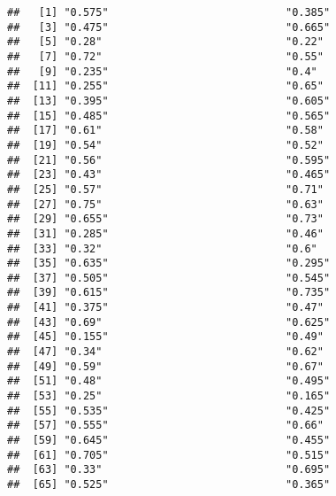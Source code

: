 \documentclass[
]{article}
\begin{document}
\begin{verbatim}
##   [1] "0.575"                            "0.385"                           
##   [3] "0.475"                            "0.665"                           
##   [5] "0.28"                             "0.22"                            
##   [7] "0.72"                             "0.55"                            
##   [9] "0.235"                            "0.4"                             
##  [11] "0.255"                            "0.65"                            
##  [13] "0.395"                            "0.605"                           
##  [15] "0.485"                            "0.565"                           
##  [17] "0.61"                             "0.58"                            
##  [19] "0.54"                             "0.52"                            
##  [21] "0.56"                             "0.595"                           
##  [23] "0.43"                             "0.465"                           
##  [25] "0.57"                             "0.71"                            
##  [27] "0.75"                             "0.63"                            
##  [29] "0.655"                            "0.73"                            
##  [31] "0.285"                            "0.46"                            
##  [33] "0.32"                             "0.6"                             
##  [35] "0.635"                            "0.295"                           
##  [37] "0.505"                            "0.545"                           
##  [39] "0.615"                            "0.735"                           
##  [41] "0.375"                            "0.47"                            
##  [43] "0.69"                             "0.625"                           
##  [45] "0.155"                            "0.49"                            
##  [47] "0.34"                             "0.62"                            
##  [49] "0.59"                             "0.67"                            
##  [51] "0.48"                             "0.495"                           
##  [53] "0.25"                             "0.165"                           
##  [55] "0.535"                            "0.425"                           
##  [57] "0.555"                            "0.66"                            
##  [59] "0.645"                            "0.455"                           
##  [61] "0.705"                            "0.515"                           
##  [63] "0.33"                             "0.695"                           
##  [65] "0.525"                            "0.365"                           

\end{verbatim}
\end{document}
